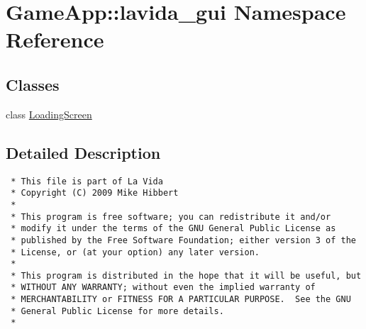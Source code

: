 \hypertarget{namespaceGameApp_1_1lavida__gui}{
\section{GameApp::lavida\_\-gui Namespace Reference}
\label{namespaceGameApp_1_1lavida__gui}
}


\subsection*{Classes}
\begin{CompactItemize}
\item 
class \hyperlink{classGameApp_1_1lavida__gui_1_1LoadingScreen}{LoadingScreen}
\end{CompactItemize}


\subsection{Detailed Description}


\footnotesize\begin{verbatim}
 * This file is part of La Vida
 * Copyright (C) 2009 Mike Hibbert
 *
 * This program is free software; you can redistribute it and/or
 * modify it under the terms of the GNU General Public License as
 * published by the Free Software Foundation; either version 3 of the
 * License, or (at your option) any later version.
 *
 * This program is distributed in the hope that it will be useful, but
 * WITHOUT ANY WARRANTY; without even the implied warranty of
 * MERCHANTABILITY or FITNESS FOR A PARTICULAR PURPOSE.  See the GNU
 * General Public License for more details.
 *
\end{verbatim}
\normalsize
 